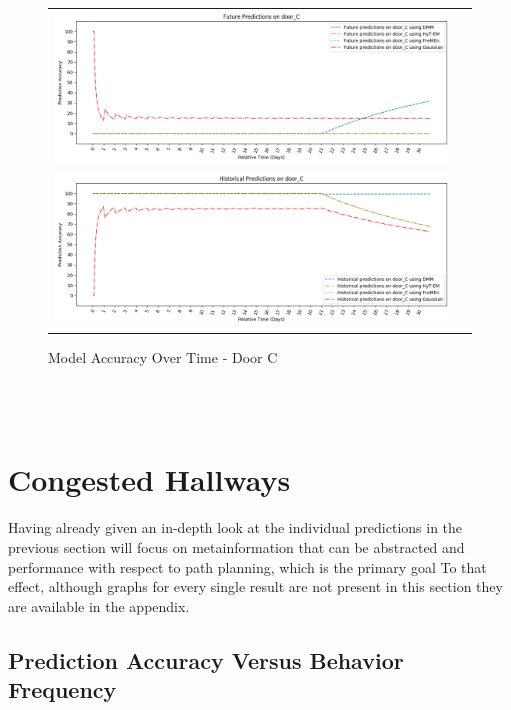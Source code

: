\begin{center}
\begin{figure}[!Hp]
  \begin{tabular}{cc}
    {\includegraphics[width = 6in]{images/results/Future_Predictions_on_door_C.png}} \\
    {\includegraphics[width = 6in]{images/results/Historical_Predictions_on_door_C.png}} \\
  \end{tabular}
  \caption{Model Accuracy Over Time - Door C}
  \label{figure:accuracy_door_C}
\end{figure}\\ \\
\end{center}


\section{ Congested Hallways }

Having already given an in-depth look at the individual predictions in the
previous section will
focus on metainformation that can be abstracted and
performance with respect to path planning, which is the primary goal
To that effect, although graphs for every single result are not
present in this section they are available in the appendix.

\subsection{ Prediction Accuracy Versus Behavior Frequency }

